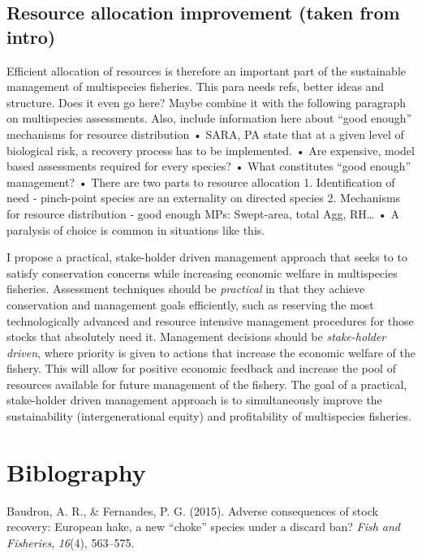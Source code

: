 \documentclass[12pt,]{scrartcl}
\begin{document}
\subsection{Resource allocation improvement (taken from
intro)}\label{resource-allocation-improvement-taken-from-intro}

Efficient allocation of resources is therefore an important part of the
sustainable management of multispecies fisheries. This para needs refs,
better ideas and structure. Does it even go here? Maybe combine it with
the following paragraph on multispecies assessments. Also, include
information here about ``good enough'' mechanisms for resource
distribution • SARA, PA state that at a given level of biological risk,
a recovery process has to be implemented. • Are expensive, model based
assessments required for every species? • What constitutes ``good
enough'' management? • There are two parts to resource allocation 1.
Identification of need - pinch-point species are an externality on
directed species 2. Mechanisms for resource distribution - good enough
MPs: Swept-area, total Agg, RH\ldots{} • A paralysis of choice is common
in situations like this.

I propose a practical, stake-holder driven management approach that
seeks to to satisfy conservation concerns while increasing economic
welfare in multispecies fisheries. Assessment techniques should be
\emph{practical} in that they achieve conservation and management goals
efficiently, such as reserving the most technologically advanced and
resource intensive management procedures for those stocks that
absolutely need it. Management decisions should be \emph{stake-holder
driven}, where priority is given to actions that increase the economic
welfare of the fishery. This will allow for positive economic feedback
and increase the pool of resources available for future management of
the fishery. The goal of a practical, stake-holder driven management
approach is to simultaneously improve the sustainability
(intergenerational equity) and profitability of multispecies fisheries.

\section{Biblography}\label{biblography}

\hypertarget{refs}{}
\hypertarget{ref-baudron2015adverse}{}
Baudron, A. R., \& Fernandes, P. G. (2015). Adverse consequences of
stock recovery: European hake, a new ``choke'' species under a discard
ban? \emph{Fish and Fisheries}, \emph{16}(4), 563--575.
\end{document}
